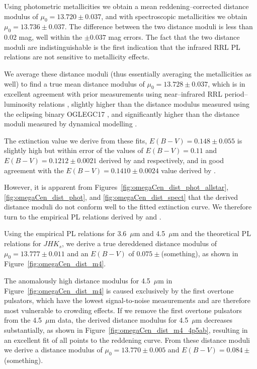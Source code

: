\documentclass[a4paper,fleqn,usenatbib]{mnras}
\begin{document}
Using photometric metallicities we obtain a mean reddening--corrected distance modulus of $\mu_0 = 13.720 \pm 0.037$, and with spectroscopic metallicities we obtain $\mu_0 = 13.736 \pm 0.037$.
The difference between the two distance moduli is less than 0.02 mag, well within the $\pm 0.037$ mag errors. The fact that the two distance moduli are indistinguishable is the first indication that the infrared RRL PL relations are not sensitive to metallicity effects.

We average these distance moduli (thus essentially averaging the metallicities as well) to find a true mean distance modulus of $\mu_0 = 13.728 \pm 0.037$, which is in excellent agreement with prior measurements using near--infrared RRL period--luminosity relations \citep{2006ApJ...652..362D}, slightly higher than the distance modulus measured using the eclipsing binary OGLEGC17 \citep{2001AJ....121.3089T}, and significantly higher than the distance moduli measured by dynamical modelling \citep{2006A&A...445..513V,
2013MNRAS.436.2598W}.

The extinction value we derive from these fits, $E(B-V) = 0.148 \pm 0.055$ is slightly high but within error of the values of $E(B-V) = 0.11$ and $E(B-V) = 0.1212 \pm 0.0021$ derived by \citet{2002ASPC..265...95L} and \citet{2011ApJ...737..103S} respectively, and in good agreement with the $E(B-V) = 0.1410 \pm 0.0024$ value derived by \citet{1998ApJ...500..525S}.

However, it is apparent from Figures~\ref{fig:omegaCen_dist_phot_allstar}, \ref{fig:omegaCen_dist_phot}, and \ref{fig:omegaCen_dist_spect} that the derived distance moduli do not conform well to the fitted extinction curve. We therefore turn to the empirical PL relations derived by \citet{2015arXiv150507858N} and \citet{2015ApJ...799..165B}.

Using the empirical PL relations for 3.6~$\mu$m and 4.5~$\mu$m and the theoretical PL relations for $J\!H\!K_s$, we derive a true dereddened distance modulus of $\mu_0 = 13.777 \pm 0.011$ and an $E(B-V)$ of $0.075 \pm $(something), as shown in Figure~\ref{fig:omegaCen_dist_m4}.

The anomalously high distance modulus for 4.5~$\mu$m in Figure~\ref{fig:omegaCen_dist_m4} is caused exclusively by the first overtone pulsators, which have the lowest signal-to-noise measurements and are therefore most vulnerable to crowding effects. If we remove the first overtone pulsators from the 4.5~$\mu$m data, the derived distance modulus for 4.5~$\mu$m decreases substantially, as shown in Figure~\ref{fig:omegaCen_dist_m4_4p5ab}, resulting in an excellent fit of all points to the reddening curve. From these distance moduli we derive a distance modulus of $\mu_0 = 13.770 \pm 0.005$ and $E(B-V) = 0.084 \pm$(something).
\end{document}
